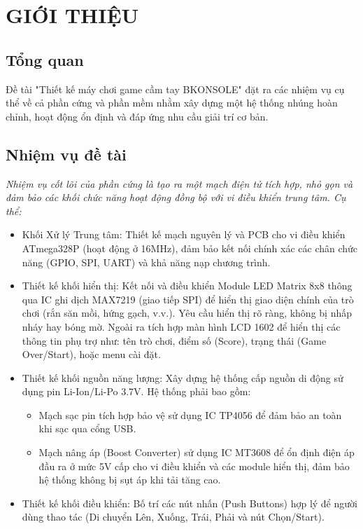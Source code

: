 \section{GIỚI THIỆU}
\subsection{Tổng quan}
Đề tài "Thiết kế máy chơi game cầm tay BKONSOLE" đặt ra các nhiệm vụ cụ thể về cả phần cứng và phần mềm nhằm xây dựng một hệ thống nhúng hoàn chỉnh, hoạt động ổn định và đáp ứng nhu cầu giải trí cơ bản.
\subsection{Nhiệm vụ đề tài}
\textit{Nhiệm vụ cốt lõi của phần cứng là tạo ra một mạch điện tử tích hợp, nhỏ gọn và đảm bảo các khối chức năng hoạt động đồng bộ với vi điều khiển trung tâm. Cụ thể:}
\begin{itemize}
    \item Khối Xử lý Trung tâm: Thiết kế mạch nguyên lý và PCB cho vi điều khiển ATmega328P (hoạt động ở 16MHz), đảm bảo kết nối chính xác các chân chức năng (GPIO, SPI, UART) và khả năng nạp chương trình.
    \item Thiết kế khối hiển thị: Kết nối và điều khiển Module LED Matrix 8x8 thông qua IC ghi dịch MAX7219 (giao tiếp SPI) để hiển thị giao diện chính của trò chơi (rắn săn mồi, hứng gạch, v.v.). Yêu cầu hiển thị rõ ràng, không bị nhấp nháy hay bóng mờ. Ngoài ra tích hợp màn hình LCD 1602 để hiển thị các thông tin phụ trợ như: tên trò chơi, điểm số (Score), trạng thái (Game Over/Start), hoặc menu cài đặt.
    \item Thiết kế khối nguồn năng lượng: Xây dựng hệ thống cấp nguồn di động sử dụng pin Li-Ion/Li-Po 3.7V. Hệ thống phải bao gồm:
        \begin{itemize}
            \item Mạch sạc pin tích hợp bảo vệ sử dụng IC TP4056 để đảm bảo an toàn khi sạc qua cổng USB.
            \item Mạch nâng áp (Boost Converter) sử dụng IC MT3608 để ổn định điện áp đầu ra ở mức 5V cấp cho vi điều khiển và các module hiển thị, đảm bảo hệ thống không bị sụt áp khi tải tăng cao.
        \end{itemize}
    \item Thiết kế khối điều khiển: Bố trí các nút nhấn (Push Buttons) hợp lý để người dùng thao tác (Di chuyển Lên, Xuống, Trái, Phải và nút Chọn/Start).
\end{itemize}


